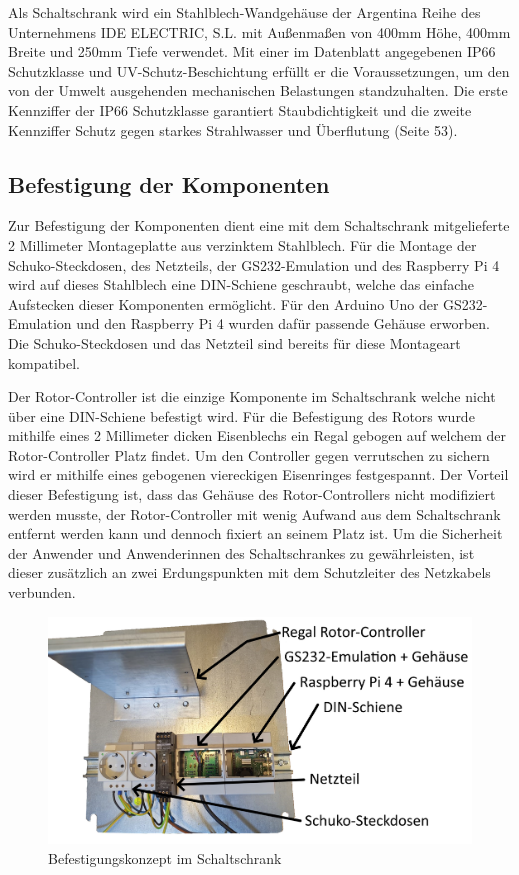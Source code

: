 Als Schaltschrank wird ein Stahlblech-Wandgehäuse der Argentina Reihe des Unternehmens IDE ELECTRIC, S.L. mit Außenmaßen von 400mm Höhe, 400mm Breite und 250mm Tiefe verwendet. Mit einer im Datenblatt \cite{ide_electric_sl_datenblatt_nodate} angegebenen IP66 Schutzklasse und UV-Schutz-Beschichtung erfüllt er die Voraussetzungen, um den von der Umwelt ausgehenden mechanischen Belastungen standzuhalten. Die erste Kennziffer der IP66 Schutzklasse garantiert Staubdichtigkeit und die zweite Kennziffer Schutz gegen starkes Strahlwasser und Überflutung \cite{lienig_elektronische_2014} (Seite 53).

\subsection{Befestigung der Komponenten}
Zur Befestigung der Komponenten dient eine mit dem Schaltschrank mitgelieferte 2 Millimeter Montageplatte aus verzinktem Stahlblech. Für die Montage der Schuko-Steckdosen, des Netzteils, der GS232-Emulation und des Raspberry Pi 4 wird auf dieses Stahlblech eine DIN-Schiene geschraubt, welche das einfache Aufstecken dieser Komponenten ermöglicht. Für den Arduino Uno der GS232-Emulation und den Raspberry Pi 4 wurden dafür passende Gehäuse erworben. Die Schuko-Steckdosen und das Netzteil sind bereits für diese Montageart kompatibel. 

Der Rotor-Controller ist die einzige Komponente im Schaltschrank welche nicht über eine DIN-Schiene befestigt wird. Für die Befestigung des Rotors wurde mithilfe eines 2 Millimeter dicken Eisenblechs ein Regal gebogen auf welchem der Rotor-Controller Platz findet. Um den Controller gegen verrutschen zu sichern wird er mithilfe eines gebogenen viereckigen Eisenringes festgespannt. Der Vorteil dieser Befestigung ist, dass das Gehäuse des Rotor-Controllers nicht modifiziert werden musste, der Rotor-Controller mit wenig Aufwand aus dem Schaltschrank entfernt werden kann und dennoch fixiert an seinem Platz ist. Um die Sicherheit der Anwender und Anwenderinnen des Schaltschrankes zu gewährleisten, ist dieser zusätzlich an zwei Erdungspunkten mit dem Schutzleiter des Netzkabels verbunden.

\begin{figure}[H]
	\centering
	\includegraphics[width=0.7\linewidth]{../ref/Schaltschrank_Befestigung.jpg}
	\caption{Befestigungskonzept im Schaltschrank}
	\label{fig:schaltschrankbefestigung}
\end{figure}

